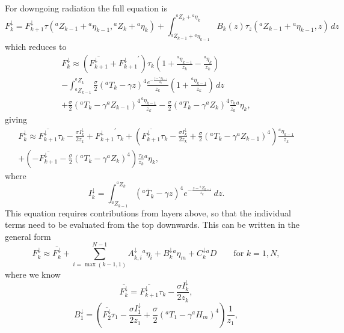 \documentclass[11pt, a4paper,twoside]{article}
\newcommand{\etb}[2]{{{}^{#1}\eta_{#2}}}
\newcommand{\HH}[2]{{{}^{#1}H_{#2}}}
\newcommand{\Z}[2]{{{}^{#1}Z_{#2}}}
\newcommand{\T}[2]{{{}^{#1}T_{#2}}}
\newcommand{\adown}[1]{A^{\downarrow}_{#1}}
\newcommand{\bdown}[1]{B^{\downarrow}_{#1}}
\newcommand{\cdown}[1]{C^{\downarrow}_{#1}}
\newcommand{\idown}[1]{I^{\downarrow}_{#1}}
\newcommand{\Fdown}[1]{{F^{\downarrow}_{#1}}}
\newcommand{\B}[1]{{B_{#1}}}
\newcommand{\D}[1]{{}^{#1}D}
\numberwithin{equation}{section}
\begin{document}
\begin{description}
For downgoing radiation the full equation is
\begin{equation}
\Fdown{k} =  \Fdown{k+1}\tau(\Z{a}{k-1}+\etb{a}{k-1},\Z{a}{k}+\etb{a}{k}) + \int_{\Z{a}{k-1}+\etb{a}{k-1}}^{\Z{a}{k}+\etb{a}{k}} \B{k}(z) \tau_z(\Z{a}{k-1}+\etb{a}{k-1},z) \, dz
\end{equation}
which reduces to
\begin{multline}
\Fdown{k} \approx \left( \overline{\Fdown{k+1}} + \Fdown{k+1}^{\prime} \right) \tau_k \left( 1 + \frac{\etb{a}{k-1}}{z_k} - \frac{\etb{a}{k}}{z_k} \right) \\
- \int_{\Z{a}{k-1}}^{\Z{a}{k}} \frac{\sigma}{2}(\T{a}{k} - \gamma z)^4\frac{e^{-\frac{z-\Z{a}{k-1}}{z_k}}}{z_k}\left(1+\frac{\etb{a}{k-1}}{z_k}\right)  \, dz\\
 + \frac{\sigma}{2}(\T{a}{k} - \gamma \Z{a}{k-1})^4\frac{\etb{a}{k-1}}{z_k} - \frac{\sigma}{2}(\T{a}{k} - \gamma \Z{a}{k})^4\frac{\tau_k}{z_k}\etb{a}{k},
\end{multline}
giving
\begin{multline}
\Fdown{k} \approx \overline{\Fdown{k+1}}\tau_k - \frac{\sigma \idown{k}}{2 z_k} + \Fdown{k+1}^{\prime} \tau_k +  \left( \overline{\Fdown{k+1}}\tau_k - \frac{\sigma \idown{k}}{2 z_k} +  \frac{\sigma}{2}(\T{a}{k} - \gamma \Z{a}{k-1})^4\right) \frac{\etb{a}{k-1}}{z_k} \\
+ \left( - \overline{\Fdown{k+1}} - \frac{\sigma}{2}(\T{a}{k} - \gamma \Z{a}{k})^4\right) \frac{\tau_k}{z_k}\etb{a}{k},
\end{multline}
where
\[\idown{k} = \int_{\Z{a}{k-1}}^{\Z{a}{k}} \left(\overline{\T{a}{k}} - \gamma z\right)^4 e^{-\frac{z-\Z{a}{k-1}}{z_k}} \,dz.\]
This equation requires contributions from layers above, so that the individual terms need to be evaluated from the top downwards.
This can be written in the general form
\begin{equation}
\Fdown{k} \approx \overline{\Fdown{k}} + \sum_{i=\max(k-1,1)}^{N-1} \adown{k,i} \etb{a}{i} + \bdown{k} \etb{a}{m} + \cdown{k} \D{a} \quad \quad \textrm{for }k=1,N,
\end{equation}
where we know
\begin{equation}
 \overline{\Fdown{k}} =\overline{\Fdown{k+1}}\tau_k - \frac{\sigma \idown{k}}{2 z_k},
\end{equation}
\begin{equation}
\bdown{1} = \left( \overline{\Fdown{2}}\tau_1 - \frac{\sigma \idown{1}}{2 z_1} +\frac{\sigma}{2}(\T{a}{1} - \gamma \HH{a}{m})^4\right) \frac{1}{z_1} ,
\end{equation}

\end{description}
\end{document}

